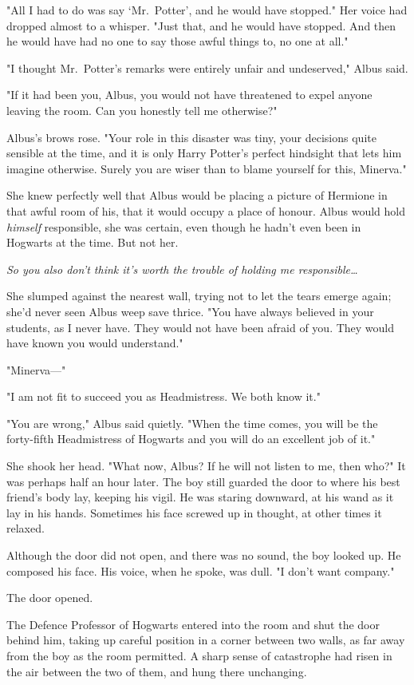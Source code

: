 "All I had to do was say `Mr.~Potter', and he would have stopped." Her voice
had dropped almost to a whisper. "Just that, and he would have stopped. And
then he would have had no one to say those awful things to, no one at all."

"I thought Mr.~Potter's remarks were entirely unfair and undeserved," Albus
said.

"If it had been you, Albus, you would not have threatened to expel anyone
leaving the room. Can you honestly tell me otherwise?"

Albus's brows rose. "Your role in this disaster was tiny, your decisions quite
sensible at the time, and it is only Harry Potter's perfect hindsight that lets
him imagine otherwise. Surely you are wiser than to blame yourself for this,
Minerva."

She knew perfectly well that Albus would be placing a picture of Hermione in
that awful room of his, that it would occupy a place of honour. Albus would hold
\emph{himself} responsible, she was certain, even though he hadn't even been in
Hogwarts at the time. But not her.

\emph{So you also don't think it's worth the trouble of holding me
responsible{\ldots}}

She slumped against the nearest wall, trying not to let the tears emerge again;
she'd never seen Albus weep save thrice. "You have always believed in your
students, as I never have. They would not have been afraid of you. They would
have known you would understand."

"Minerva---"

"I am not fit to succeed you as Headmistress. We both know it."

"You are wrong," Albus said quietly. "When the time comes, you will be the
forty-fifth Headmistress of Hogwarts and you will do an excellent job of it."

She shook her head. "What now, Albus? If he will not listen to me, then who?"
\later
It was perhaps half an hour later. The boy still guarded the door to where his
best friend's body lay, keeping his vigil. He was staring downward, at his wand
as it lay in his hands. Sometimes his face screwed up in thought, at other
times it relaxed.

Although the door did not open, and there was no sound, the boy looked up. He
composed his face. His voice, when he spoke, was dull. "I don't want company."

The door opened.

The Defence Professor of Hogwarts entered into the room and shut the door
behind him, taking up careful position in a corner between two walls, as far
away from the boy as the room permitted. A sharp sense of catastrophe had risen
in the air between the two of them, and hung there unchanging.

